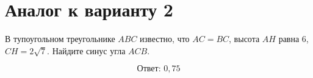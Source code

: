 \documentclass[12pt,a4paper]{article}
\begin{document}
\section*{Аналог к варианту 2}
В тупоугольном треугольнике \(ABC\) известно, что \(AC=BC\), высота \(AH\) равна \(6\), \(CH=2\sqrt7\). Найдите синус угла \(ACB\).
\begin{center}\figIsoscelesObtuse\end{center}
\[\boxed{\text{Ответ: }0{,}75}\]
\end{document}
